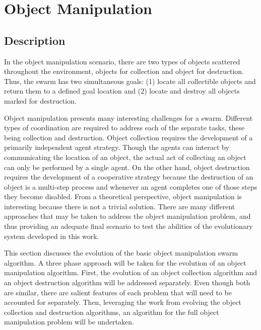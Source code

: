 

\section{Object Manipulation} 

\subsection{Description}

In the object manipulation scenario, there are two types of objects scattered throughout the environment, objects for collection and object for destruction.  Thus, the swarm has two simultaneous goals: (1) locate all collectible objects and return them to a defined goal location and (2) locate and destroy all objects marked for destruction.  

Object manipulation presents many interesting challenges for a swarm.  Different types of coordination are required to address each of the separate tasks, these being collection and destruction.  Object collection requires the development of a primarily independent agent strategy.  Though the agents can interact by communicating the location of an object, the actual act of collecting an object can only be performed by a single agent.  On the other hand, object destruction requires the development of a cooperative strategy because the destruction of an object is a multi-step process and whenever an agent completes one of those steps they become disabled.   From a theoretical perspective, object manipulation is interesting because there is not a trivial solution.  There are many different approaches that may be taken to address the object manipulation problem, and thus providing an adequate final scenario to test the abilities of the evolutionary system developed in this work.

This section discusses the evolution of the basic object manipulation swarm algorithm.  A three phase approach will be taken for the evolution of an object manipulation algorithm.  First, the evolution of an object collection algorithm and an object destruction algorithm will be addressed separately.  Even though both are similar, there are salient features of each problem that will need to be accounted for separately.  Then, leveraging the work from evolving the object collection and destruction algorithms, an algorithm for the full object manipulation problem will be undertaken.
 
